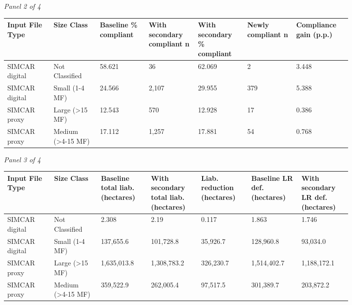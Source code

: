 \documentclass[12pt]{article}
\begin{document}
\begin{landscape}
\begin{table}[H]
\textit{Panel 2 of 4}\\[2pt]
{\fontsize{12}{14}\selectfont
\setlength{\tabcolsep}{3pt}
\renewcommand{\arraystretch}{1.08}
\begin{tabular}{p{0.117\linewidth}p{0.117\linewidth}p{0.117\linewidth}p{0.117\linewidth}p{0.117\linewidth}p{0.117\linewidth}p{0.117\linewidth}}
\toprule
Input File Type & Size Class & Baseline \% compliant & With secondary compliant n & With secondary \% compliant & Newly compliant n & Compliance gain (p.p.) \\
\midrule
SIMCAR digital & Not Classified & 58.621 & 36 & 62.069 & 2 & 3.448 \\
SIMCAR digital & Small (1-4 MF) & 24.566 & 2,107 & 29.955 & 379 & 5.388 \\
SIMCAR proxy & Large (>15 MF) & 12.543 & 570 & 12.928 & 17 & 0.386 \\
SIMCAR proxy & Medium (>4-15 MF) & 17.112 & 1,257 & 17.881 & 54 & 0.768 \\
\bottomrule
\end{tabular}
}

\vspace{0.6em}

\textit{Panel 3 of 4}\\[2pt]
{\fontsize{12}{14}\selectfont
\setlength{\tabcolsep}{3pt}
\renewcommand{\arraystretch}{1.08}
\begin{tabular}{p{0.117\linewidth}p{0.117\linewidth}p{0.117\linewidth}p{0.117\linewidth}p{0.117\linewidth}p{0.117\linewidth}p{0.117\linewidth}}
\toprule
Input File Type & Size Class & Baseline total liab. (hectares) & With secondary total liab. (hectares) & Liab. reduction (hectares) & Baseline LR def. (hectares) & With secondary LR def. (hectares) \\
\midrule
SIMCAR digital & Not Classified & 2.308 & 2.19 & 0.117 & 1.863 & 1.746 \\
SIMCAR digital & Small (1-4 MF) & 137,655.6 & 101,728.8 & 35,926.7 & 128,960.8 & 93,034.0 \\
SIMCAR proxy & Large (>15 MF) & 1,635,013.8 & 1,308,783.2 & 326,230.7 & 1,514,402.7 & 1,188,172.1 \\
SIMCAR proxy & Medium (>4-15 MF) & 359,522.9 & 262,005.4 & 97,517.5 & 301,389.7 & 203,872.2 \\
\bottomrule
\end{tabular}
}

\vspace{0.6em}


\end{table}
\end{landscape}
\end{document}
